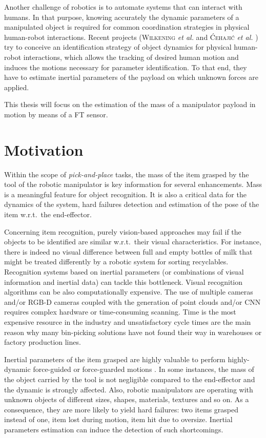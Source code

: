 \documentclass[/home/francois/latex/report/main.tex]{subfiles}
\begin{document}
Another challenge of robotics is to automate systems that can interact with humans. In that purpose, knowing accurately the dynamic parameters of a manipulated object is required for common coordination strategies in physical human-robot interactions. Recent projects (\textsc{Wilkening} \textit{et al.} \cite{Wilkening2016} and \textsc{Ćehajić} \textit{et al.} \cite{Ćehajić2017}) try to conceive an identification strategy of object dynamics for physical human-robot interactions, which allows the tracking of desired human motion and induces the motions necessary for parameter identification. To that end, they have to estimate inertial parameters of the payload on which unknown forces are applied.

This thesis will focus on the estimation of the mass of a manipulator payload in motion by means of a \ac{FT} sensor.

\section{Motivation}

Within the scope of \textit{pick-and-place} tasks, the mass of the item grasped by the tool of the robotic manipulator is key information for several enhancements. Mass is a meaningful feature for object recognition. It is also a critical data for the dynamics of the system, hard failures detection and estimation of the pose of the item w.r.t.\ the end-effector.

Concerning item recognition, purely vision-based approaches may fail if the objects to be identified are similar w.r.t.\ their visual characteristics. For instance, there is indeed no visual difference between full and empty bottles of milk that might be treated differently by a robotic system for sorting recyclables. Recognition systems based on inertial parameters (or combinations of visual information and inertial data) can tackle this bottleneck.
Visual recognition algorithms can be also computationally expensive. The use of multiple cameras and/or RGB-D cameras coupled with the generation of point clouds and/or \ac{CNN} requires complex hardware or time-consuming scanning. Time is the most expensive resource in the industry and unsatisfactory cycle times are the main reason why many bin-picking solutions have not found their way in warehouses or factory production lines.

Inertial parameters of the item grasped are highly valuable to perform highly-dynamic force-guided or force-guarded motions \cite{Garcia2006, KubusKroger2008}. In some instances, the mass of the object carried by the tool is not negligible compared to the end-effector and the dynamic is strongly affected.
Also, robotic manipulators are operating with unknown objects of different sizes, shapes, materials, textures and so on. As a consequence, they are more likely to yield hard failures: two items grasped instead of one, item lost during motion, item hit due to oversize. Inertial parameters estimation can induce the detection of such shortcomings.
\end{document}
